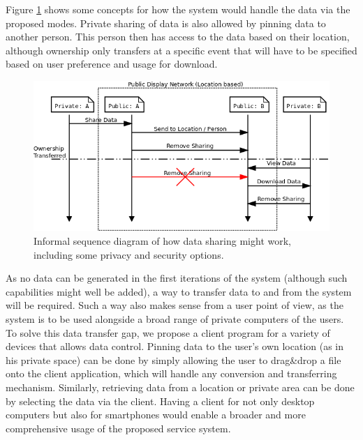 Figure \ref{data_share_sequence} shows some concepts for how the system would handle the data via the proposed modes.
Private sharing of data is also allowed by pinning data to another person.
This person then has access to the data based on their location, although ownership only transfers at a specific event that will have to be specified based on user preference and usage for download.

\begin{figure}
	\centering
	\includegraphics[width=\linewidth]{img/data_sharing.png}
	\caption[Data Sharing Sequence]{Informal sequence diagram of how data sharing might work, including some privacy and security options.}
	\label{data_share_sequence}
\end{figure}

As no data can be generated in the first iterations of the system (although such capabilities might well be added), a way to transfer data to and from the system will be required.
Such a way also makes sense from a user point of view, as the system is to be used alongside a broad range of private computers of the users.
To solve this data transfer gap, we propose a client program for a variety of devices that allows data control.
Pinning data to the user's own location (as in his private space) can be done by simply allowing the user to drag\&drop a file onto the client application, which will handle any conversion and transferring mechanism.
Similarly, retrieving data from a location or private area can be done by selecting the data via the client.
Having a client for not only desktop computers but also for smartphones would enable a broader and more comprehensive usage of the proposed service system.
